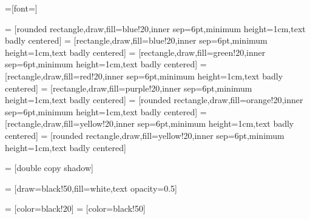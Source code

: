 
=[font=\rmfamily]

 = [rounded rectangle,draw,fill=blue!20,inner sep=6pt,minimum height=1cm,text badly centered]
 = [rectangle,draw,fill=blue!20,inner sep=6pt,minimum height=1cm,text badly centered]
 = [rectangle,draw,fill=green!20,inner sep=6pt,minimum height=1cm,text badly centered]
 = [rectangle,draw,fill=red!20,inner sep=6pt,minimum height=1cm,text badly centered]
 = [rectangle,draw,fill=purple!20,inner sep=6pt,minimum height=1cm,text badly centered]
 = [rounded rectangle,draw,fill=orange!20,inner sep=6pt,minimum height=1cm,text badly centered]
 = [rectangle,draw,fill=yellow!20,inner sep=6pt,minimum height=1cm,text badly centered]
 = [rounded rectangle,draw,fill=yellow!20,inner sep=6pt,minimum height=1cm,text badly centered]

 = [double copy shadow]

 = [draw=black!50,fill=white,text opacity=0.5]

 = [color=black!20]
 = [color=black!50]


